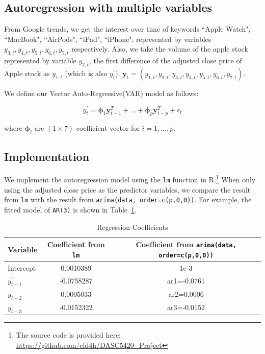 \documentclass[conference,onecolumn,11pt]{IEEEtran}
\begin{document}
\subsection*{Autoregression with multiple variables}
\label{mod2}

From Google trends, we get the interest over time of keywords ``Apple Watch", ``MacBook", ``AirPods", ``iPad", ``iPhone", represented by variables $y_{3,t},y_{4,t},y_{5,t},y_{6,t},y_{7,t}$ respectively. Also, we take the volume of the apple stock represented by variable $y_{2,t}$, the first difference of the adjusted close price of Apple stock as $y_{1,t}$ (which is also $y^{'}_t$). $\mathbf{y}_t = (y_{1,t},y_{2,t},y_{3,t},y_{4,t},y_{5,t},y_{6,t},y_{7,t})$.

We define our Vector Auto-Regressive(VAR) model as follows:

\[
y^{'}_t = \boldsymbol{\phi}_1\mathbf{y}_{t-1}^T+\ldots+\boldsymbol{\phi}_p\mathbf{y}_{t-p}^T+\epsilon_t
\]

where $\boldsymbol{\phi}_i$ are $(1\times7)$ coefficient vector for $i=1,\ldots,p$.

\subsection*{Implementation}

We implement the autoregression model using the \texttt{lm} function in R.\footnote{The source code is provided here: \url{https://github.com/cld4h/DASC5420_Project}} When only using the adjusted close price as the predictor variables, we compare the result from \texttt{lm} with the result from \texttt{arima(data, order=c(p,0,0))}. For example, the fitted model of \texttt{AR(3)} is shown in Table~\ref{tab:regression}.

\begin{table}[htbp]
  \centering
  \caption{Regression Coefficients}
  \begin{tabular}{lcc}
    \toprule
    \textbf{Variable} & \textbf{Coefficient from \texttt{lm}} & \textbf{Coefficient from \texttt{arima(data, order=c(p,0,0))}}\\
    \midrule
    Intercept & 0.0010389 & 1e-3\\
    $y^{'}_{t-1}$ & -0.0758287 & ar1=-0.0761\\
    $y^{'}_{t-2}$ & 0.0005033 & ar2=0.0006\\
    $y^{'}_{t-3}$ & -0.0152322 & ar3=-0.0152\\
    \bottomrule
  \end{tabular}
  \label{tab:regression}
\end{table}
\end{document}
